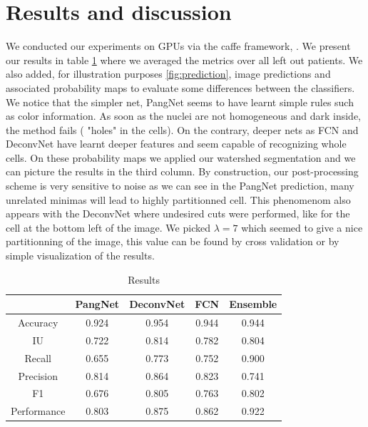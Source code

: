 \documentclass{article}
\begin{document}
\section{Results and discussion}
\label{sec:result}
\noindent We conducted our experiments on GPUs via the caffe framework, 
\cite{jia2014caffe}. We present our results in table \ref{tab:res} where 
we averaged the metrics over all left out patients. We also added, for 
illustration purposes \ref{fig:prediction}, image predictions and 
associated 
probability maps to evaluate some differences between the classifiers. 
We notice that the simpler net, PangNet seems to have learnt simple 
rules such as color information. As soon as the nuclei are not
homogeneous and dark inside, the method fails ( "holes" in the
cells). On the 
contrary, deeper nets as FCN and DeconvNet have learnt deeper features 
and seem capable of recognizing whole cells. On these probability maps 
we applied our watershed segmentation and we can picture the results in 
the third 
column. By construction, our post-processing 
scheme is very sensitive to noise as we can see in the PangNet 
prediction, many unrelated minimas will lead to highly partitionned cell. 
This phenomenom also appears with the DeconvNet where undesired 
cuts were performed, like for the cell at the bottom left of the image. 
We picked $\lambda = 7$ which seemed to give a nice partitionning of 
the image, this value can be found by cross validation or by simple 
visualization of the results.
\begin{table}
\begin{tabular}{|c|c|c|c|c|}
\hline
  & PangNet & DeconvNet & FCN & Ensemble\\
 \hline
Accuracy  &  0.924 & 0.954 &0.944 & 0.944  \\
IU   &    0.722 &  0.814 & 0.782 & 0.804 \\
Recall     &  0.655  & 0.773 & 0.752 & 0.900 \\
Precision   &  0.814 & 0.864 & 0.823 & 0.741 \\
F1    &       0.676 &     0.805 & 0.763  & 0.802\\
Performance    &   0.803   & 0.875 & 0.862 & 0.922 \\
\hline
\end{tabular}
\caption{Results}
\label{tab:res}
\end{table}
\end{document}
